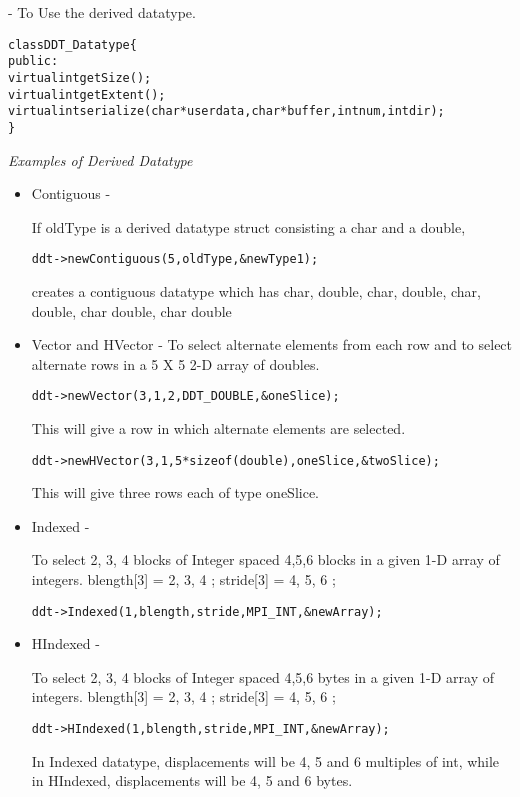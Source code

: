 - To Use the derived datatype. 
\begin{alltt}
class DDT_Datatype \{
	public:
	virtual int getSize();
	virtual int getExtent();
	virtual int serialize(char* userdata, char* buffer, int num, int dir);
\}
\end{alltt}


{\em Examples of Derived Datatype}
\begin{itemize}
\item Contiguous -

If oldType is a derived datatype struct consisting a char and a double,
\begin{alltt}
	ddt->newContiguous(5, oldType, \&newType1) ; 
\end{alltt}
	creates a contiguous datatype which has
    {char, double, char, double, char, double, char double, char double }

\item Vector and HVector -
To select alternate elements from each row and to select alternate rows in a 
5 X 5 2-D array of doubles.
\begin{alltt}
	ddt->newVector(3,1,2, DDT\_DOUBLE, \&oneSlice) ;
\end{alltt}
    This will give a row in which alternate elements are selected.
\begin{alltt}
	ddt->newHVector(3, 1, 5*sizeof(double), oneSlice, \&twoSlice) ; 
\end{alltt}
	This will give three rows each of type oneSlice.

\item Indexed -

To select 2, 3, 4 blocks of Integer spaced 4,5,6 blocks in a given 1-D array of
integers.
    blength[3] = { 2, 3, 4 } ;
	stride[3]  = { 4, 5, 6 } ;

\begin{alltt}
	ddt->Indexed(1, blength, stride, MPI\_INT, \&newArray);
\end{alltt}

\item HIndexed -

To select 2, 3, 4 blocks of Integer spaced 4,5,6 bytes in a given 1-D array of
integers.
    blength[3] = { 2, 3, 4 } ;
	stride[3]  = { 4, 5, 6 } ;

\begin{alltt}
	ddt->HIndexed(1, blength, stride, MPI\_INT, \&newArray);
\end{alltt}

In Indexed datatype, displacements will be 4, 5 and 6  multiples of int, 
while in HIndexed, displacements will  be 4, 5 and 6 bytes.
\end{itemize}
